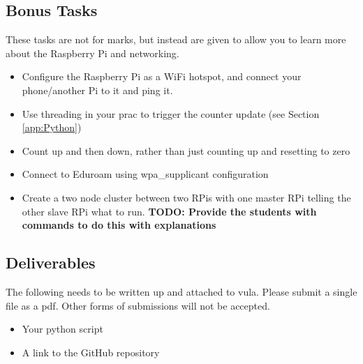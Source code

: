 \subsection{Bonus Tasks}
These tasks are not for marks, but instead are given to allow you to learn more about the Raspberry Pi and networking. 
\begin{itemize}
    \item Configure the Raspberry Pi as a WiFi hotspot, and connect your phone/another Pi to it and ping it.
    \item Use threading in your prac to trigger the counter update (see Section \ref{app:Python})
    \item Count up and then down, rather than just counting up and resetting to zero
    \item Connect to Eduroam using wpa\_supplicant configuration
    \item Create a two node cluster between two RPis with one master RPi telling the other slave RPi what to run. \textbf{TODO: Provide the students with commands to do this with explanations} 
\end{itemize}

\subsection{Deliverables}
The following needs to be written up and attached to vula. Please submit a single file as a pdf. Other forms of submissions will not be accepted.
\begin{itemize}
    \item Your python script
    \item A link to the GitHub repository
\end{itemize}